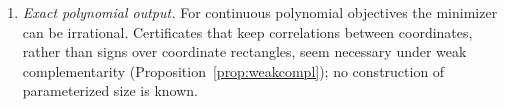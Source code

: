 \begin{enumerate}[label=(\arabic*)]
be obtained in $f'(p,\kappa_S,r)\poly(I)$ bit operations for a computable
function $f'$? For optimal sets with continuous components, the grids
produced by filtering can need a number of nodes that grows with the accuracy
(Proposition~\ref{lim:prop:setgrowth}); which compact descriptions beyond the
classes of Section~\ref{sec:optsets} can be computed with a decomposition?
\item \emph{Exact polynomial output.} For continuous polynomial objectives the
minimizer can be irrational. Certificates that keep correlations between
coordinates, rather than signs over coordinate rectangles, seem necessary
under weak complementarity (Proposition~\ref{prop:weakcompl}); no construction
of parameterized size is known.
\end{enumerate}
